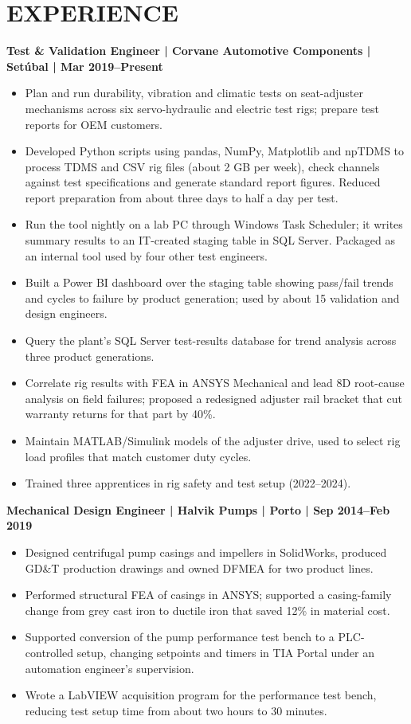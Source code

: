 \documentclass[11pt,a4paper]{article}
\begin{document}
\section*{EXPERIENCE}
\textbf{Test \& Validation Engineer | Corvane Automotive Components | Setúbal | Mar 2019--Present}
\begin{itemize}
\item Plan and run durability, vibration and climatic tests on seat-adjuster mechanisms across six servo-hydraulic and electric test rigs; prepare test reports for OEM customers.
\item Developed Python scripts using pandas, NumPy, Matplotlib and npTDMS to process TDMS and CSV rig files (about 2 GB per week), check channels against test specifications and generate standard report figures. Reduced report preparation from about three days to half a day per test.
\item Run the tool nightly on a lab PC through Windows Task Scheduler; it writes summary results to an IT-created staging table in SQL Server. Packaged as an internal tool used by four other test engineers.
\item Built a Power BI dashboard over the staging table showing pass/fail trends and cycles to failure by product generation; used by about 15 validation and design engineers.
\item Query the plant's SQL Server test-results database for trend analysis across three product generations.
\item Correlate rig results with FEA in ANSYS Mechanical and lead 8D root-cause analysis on field failures; proposed a redesigned adjuster rail bracket that cut warranty returns for that part by 40\%.
\item Maintain MATLAB/Simulink models of the adjuster drive, used to select rig load profiles that match customer duty cycles.
\item Trained three apprentices in rig safety and test setup (2022--2024).
\end{itemize}

\textbf{Mechanical Design Engineer | Halvik Pumps | Porto | Sep 2014--Feb 2019}
\begin{itemize}
\item Designed centrifugal pump casings and impellers in SolidWorks, produced GD\&T production drawings and owned DFMEA for two product lines.
\item Performed structural FEA of casings in ANSYS; supported a casing-family change from grey cast iron to ductile iron that saved 12\% in material cost.
\item Supported conversion of the pump performance test bench to a PLC-controlled setup, changing setpoints and timers in TIA Portal under an automation engineer's supervision.
\item Wrote a LabVIEW acquisition program for the performance test bench, reducing test setup time from about two hours to 30 minutes.
\end{itemize}
\end{document}
